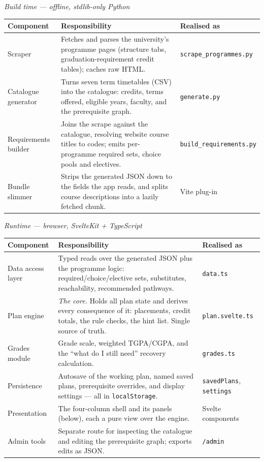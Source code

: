 \documentclass[11pt,a4paper]{article}
\begin{document}
\vspace{0.15cm}
\renewcommand{\arraystretch}{1.2}
\noindent\textit{\small Build time --- offline, stdlib-only Python}\\[2pt]
\noindent\begin{tabularx}{\textwidth}{@{}l X l@{}}
\toprule
\textbf{Component} & \textbf{Responsibility} & \textbf{Realised as} \\
\midrule
Scraper & Fetches and parses the university's programme pages (structure tabs, graduation-requirement credit tables); caches raw HTML. & \texttt{scrape\_programmes.py} \\
Catalogue generator & Turns seven term timetables (CSV) into the catalogue: credits, terms offered, eligible years, faculty, and the prerequisite graph. & \texttt{generate.py} \\
Requirements builder & Joins the scrape against the catalogue, resolving website course titles to codes; emits per-programme required sets, choice pools and electives. & \texttt{build\_requirements.py} \\
Bundle slimmer & Strips the generated JSON down to the fields the app reads, and splits course descriptions into a lazily fetched chunk. & Vite plug-in \\
\bottomrule
\end{tabularx}

\vspace{0.45cm}
\noindent\textit{\small Runtime --- browser, SvelteKit + TypeScript}\\[2pt]
\noindent\begin{tabularx}{\textwidth}{@{}l X l@{}}
\toprule
\textbf{Component} & \textbf{Responsibility} & \textbf{Realised as} \\
\midrule
Data access layer & Typed reads over the generated JSON plus the programme logic: required/choice/elective sets, substitutes, reachability, recommended pathways. & \texttt{data.ts} \\
Plan engine & \emph{The core.} Holds all plan state and derives every consequence of it: placements, credit totals, the rule checks, the hint list. Single source of truth. & \texttt{plan.svelte.ts} \\
Grades module & Grade scale, weighted TGPA/CGPA, and the ``what do I still need'' recovery calculation. & \texttt{grades.ts} \\
Persistence & Autosave of the working plan, named saved plans, prerequisite overrides, and display settings --- all in \texttt{localStorage}. & \texttt{savedPlans}, \texttt{settings} \\
Presentation & The four-column shell and its panels (below), each a pure view over the engine. & Svelte components \\
Admin tools & Separate route for inspecting the catalogue and editing the prerequisite graph; exports edits as JSON. & \texttt{/admin} \\
\bottomrule
\end{tabularx}
\end{document}
